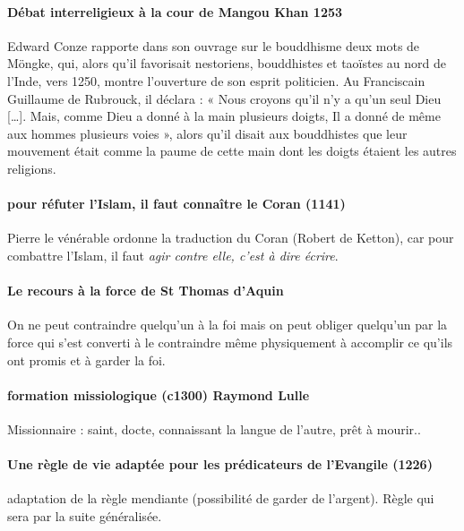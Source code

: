 \paragraph{Débat interreligieux à la cour de Mangou Khan 1253}  Edward Conze rapporte dans son ouvrage sur le bouddhisme deux mots de Möngke, qui, alors qu'il favorisait nestoriens, bouddhistes et taoïstes au nord de l'Inde, vers 1250, montre l'ouverture de son esprit politicien. Au Franciscain Guillaume de Rubrouck, il déclara : « Nous croyons qu'il n'y a qu'un seul Dieu […]. Mais, comme Dieu a donné à la main plusieurs doigts, Il a donné de même aux hommes plusieurs voies », alors qu'il disait aux bouddhistes que leur mouvement était comme la paume de cette main dont les doigts étaient les autres religions.

\paragraph{pour réfuter l'Islam, il faut connaître le Coran (1141)} Pierre le vénérable ordonne la traduction du Coran (Robert de Ketton), car pour combattre l'Islam, il faut \textit{agir contre elle, c'est à dire écrire}.


\paragraph{Le recours à la force de St Thomas d'Aquin} On ne peut contraindre quelqu'un à la foi mais on peut obliger quelqu'un par la force qui s'est converti à le contraindre même physiquement à accomplir ce qu'ils ont promis et à garder la foi. 


\paragraph{formation missiologique (c1300) Raymond Lulle} Missionnaire : saint, docte, connaissant la langue de l'autre, prêt à mourir.. 

\paragraph{Une règle de vie adaptée pour les prédicateurs de l'Evangile (1226)} adaptation de la règle mendiante (possibilité de garder de l'argent). Règle qui sera par la suite généralisée.


